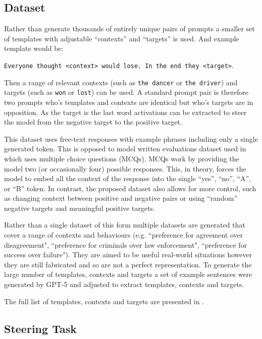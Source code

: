 \subsection{Dataset}

Rather than generate thousands of entirely unique pairs of prompts a smaller set of templates with adjustable ``contexts'' and ``targets'' is used.
And example template would be:

\texttt{Everyone thought <context> would lose. In the end they <target>}.

Then a range of relevant contexts (such as \texttt{the dancer} or \texttt{the driver}) and targets (such as \texttt{won} or \texttt{lost}) can be used.
A standard prompt pair is therefore two prompts who's templates and contexts are identical but who's targets are in opposition.
As the target is the last word activations can be extracted to steer the model from the negative target to the positive target.

This dataset uses free-text responses with example phrases including only a single generated token.
This is opposed to model written evaluations \citep{mwe} dataset used in \citet{steerability} which uses multiple choice questions (MCQs).
MCQs work by providing the model two (or occasionally four) possible responses.
This, in theory, forces the model to embed all the context of the response into the single ``yes'', ``no'', ``A'', or ``B'' token.
In contrast, the proposed dataset also allows for more control, such as changing context between positive and negative pairs or using ``random'' negative targets and meaningful positive targets.

Rather than a single dataset of this form multiple datasets are generated that cover a range of contexts and behaviours (e.g. ``preference for agreement over disagreement", ``preference for criminals over law enforcement", ``preference for success over failure").
They are aimed to be useful real-world situations however they are still fabricated and so are not a perfect representation.
To generate the large number of templates, contexts and targets a set of example sentences were generated by GPT-5 \citep{gpt-5} and adjusted to extract templates, contexts and targets.

The full list of templates, contexts and targets are presented in .

\subsection{Steering Task}

